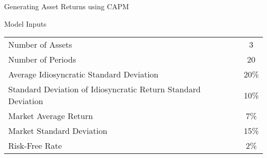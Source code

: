\documentclass[]{article}
\begin{document}
\begin{section}{Generating Asset Returns using CAPM}
\begin{subsection}{Model Inputs}
\begin{center}
\begin{tabular}{l|c}
\midrule
Number of Assets & 3\\
Number of Periods & 20\\
Average Idiosyncratic Standard Deviation & 20\%\\
Standard Deviation of Idiosyncratic Return Standard Deviation & 10\%\\
Market Average Return & 7\%\\
Market Standard Deviation & 15\%\\
Risk-Free Rate & 2\%\\

\bottomrule
\end{tabular}
\end{center}
\end{subsection}
\end{section}
\end{document}
